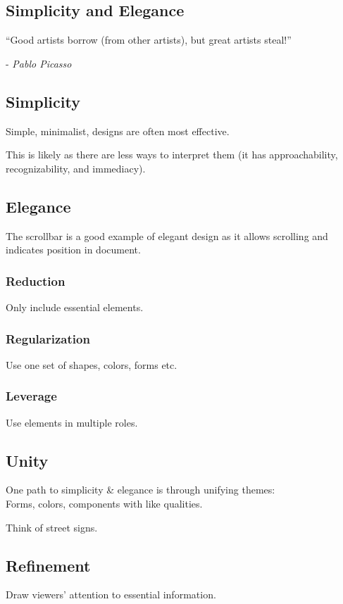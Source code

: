\subsection{Simplicity and Elegance}
\begin{shaded}
``Good artists borrow (from other artists), but great
artists steal!'' 

- \textit{Pablo Picasso}
\end{shaded}

\subsection{Simplicity}
Simple, minimalist, designs are often most effective. 

This is likely as there are less ways to interpret them (it has approachability, recognizability, and immediacy).

\subsection{Elegance}
The scrollbar is a good example of elegant design as it allows scrolling and indicates position in document.

\subsubsection{Reduction}
Only include essential elements.

\subsubsection{Regularization}
Use one set of shapes, colors, forms etc.

\subsubsection{Leverage}
Use elements in multiple roles.

\subsection{Unity}
One path to simplicity \& elegance is through unifying themes:\\
Forms, colors, components with like qualities.

Think of street signs.

\subsection{ Refinement}
Draw viewers’ attention to essential information.

